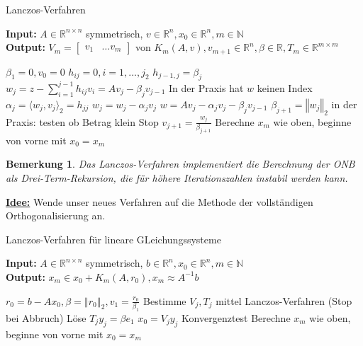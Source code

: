 \documentclass{book}
\newtheorem{remark}[algorithm]{Bemerkung}
\def\R{\mathbb{R}}
\def\N{\mathbb{N}}
\begin{document}
            \begin{algorithm}[H]\label{a3.22} %
                \caption{Lanczos-Verfahren}
                \textbf{Input:} $A\in\R^{n\times n}$ symmetrisch, $v\in\R^n,x_0\in\R^n,m\in\N$\\
                \textbf{Output:} $V_m=\begin{bmatrix}
                    v_1 & \dots v_m
                \end{bmatrix}$ von $K_m(A,v), v_{m+1}\in\R^n,\beta\in\R,T_m\in\R^{m\times m}$
                \begin{algorithmic}
                \State $\beta_1=0,v_0=0$
                    \State $h_{ij}=0,i=1,\dots,j_2$
                    \State $h_{j-1,j}=\beta_j$
                    \State $w_j=z-\sum_{i=1}^{j-1}h_{ij}v_i=Av_j-\beta_jv_{j-1}$ \Comment In der Praxis hat $w$ keinen Index
                    \State $\alpha_j = \langle w_j, v_j\rangle_2=h_{jj}$
                    \State $w_j=w_j-\alpha_j v_j$ \Comment $w=Av_j-\alpha_jv_j-\beta_jv_{j-1}$
                    \State $\beta_{j+1}=\left\Vert w_j \right\Vert_2$
                     \Comment in der Praxis: testen ob Betrag klein
                        \State Stop  
                    \EndIf
                    $v_{j+1}=\frac{w_j}{\beta_{j+1}}$
                \EndFor
                \State Berechne $x_m$ wie oben, beginne von vorne mit $x_0=x_m$
                \end{algorithmic}
            \end{algorithm}

            \begin{remark}\label{b3.23}
                Das Lanczos-Verfahren implementiert die Berechnung der ONB als Drei-Term-Rekursion,
                die für höhere Iterationszahlen instabil werden kann.
            \end{remark}

            \underline{\textbf{Idee:}} Wende unser neues Verfahren auf die Methode der vollständigen
            Orthogonalisierung an.

            \begin{algorithm}[H]\label{a3.24} %
                \caption{Lanczos-Verfahren für lineare GLeichungssysteme}
                \textbf{Input:} $A\in\R^{n\times n}$ symmetrisch, $b\in\R^n,x_0\in\R^n,m\in\N$\\
                \textbf{Output:} $x_m\in x_0 +K_m(A,r_0), x_m\approx A^{-1}b$
                \begin{algorithmic}
                \State $r_0=b-Ax_0,\beta=\left\Vert r_0 \right\Vert_2,v_1=\frac{r_0}{\beta_1}$
                    \State Bestimme $V_j,T_j$ mittel Lanczos-Verfahren (Stop bei Abbruch)
                    \State Löse $T_jy_j = \beta e_1$
                    \State $x_0 = V_jy_j$
                    Konvergenztest
                \EndFor
                \State Berechne $x_m$ wie oben, beginne von vorne mit $x_0=x_m$
                \end{algorithmic}
            \end{algorithm}
\end{document}
